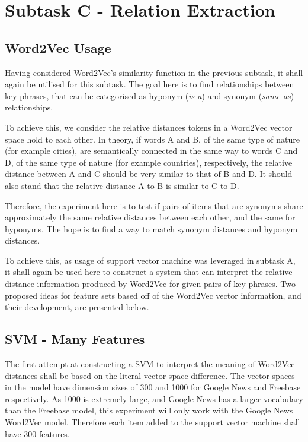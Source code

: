 \section{Subtask C - Relation Extraction}
\subsection{Word2Vec Usage}
Having considered Word2Vec's similarity function in the previous subtask, it shall again be utilised for this subtask. The goal here is to find relationships between key phrases, that can be categorised as hyponym (\textit{is-a}) and synonym (\textit{same-as}) relationships. 

To achieve this, we consider the relative distances tokens in a Word2Vec vector space hold to each other. In theory, if words A and B, of the same type of nature (for example cities), are semantically connected in the same way to words C and D, of the same type of nature (for example countries), respectively, the relative distance between A and C should be very similar to that of B and D. It should also stand that the relative distance A to B is similar to C to D. 

Therefore, the experiment here is to test if pairs of items that are synonyms share approximately the same relative distances between each other, and the same for hyponyms. The hope is to find a way to match synonym distances and hyponym distances. 

To achieve this, as usage of support vector machine was leveraged in subtask A, it shall again be used here to construct a system that can interpret the relative distance information produced by Word2Vec for given pairs of key phrases. Two proposed ideas for feature sets based off of the Word2Vec vector information, and their development, are presented below.

\subsection{SVM - Many Features}
The first attempt at constructing a SVM to interpret the meaning of Word2Vec distances shall be based on the literal vector space difference. The vector spaces in the model have dimension sizes of 300 and 1000 for Google News and Freebase respectively. As 1000 is extremely large, and Google News has a larger vocabulary than the Freebase model, this experiment will only work with the Google News Word2Vec model. Therefore each item added to the support vector machine shall have 300 features. 

